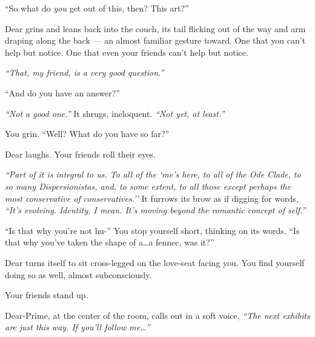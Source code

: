 \phantom{Dear, with}{\tiny its casual refusal to conform.}
\vfill

\newpage

\begin{comment}
\newpage

\null
\vfill

Dear, with its choice of form.

\null
\vfill

\newpage

\null
\vfill

Dear with its mastery of this new art.

\null
\vfill

\newpage

Dear with its casual refusal to conform.
\end{comment}

``So what do \emph{you} get out of this, then? This art?''

Dear grins and leans back into the couch, its tail flicking out of the way and arm draping along the back --- an almost familiar gesture toward. One that you can't help but notice. One that even your friends can't help but notice.

\emph{``That, my friend, is a very good question.''}

``And do you have an answer?''

\emph{``Not a good one.''} It shrugs, ineloquent. \emph{``Not yet, at least.''}

You grin. ``Well? What do you have so far?''

Dear laughs. Your friends roll their eyes.

\emph{``Part of it is integral to us. To all of the `me's here, to all of the Ode Clade, to so many Dispersionistas, and, to some extent, to all those except perhaps the most conservative of conservatives.''} It furrows its brow as if digging for words, \emph{``It's evolving. Identity, I mean. It's moving beyond the romantic concept of self.''}

``Is that why you're not hu-'' You stop yourself short, thinking on its words. ``Is that why you've taken the shape of a\ldots{}a fennec, was it?''

Dear turns itself to sit cross-legged on the love-seat facing you. You find yourself doing so as well, almost subconsciously.

Your friends stand up.

Dear-Prime, at the center of the room, calls out in a soft voice, \emph{``The next exhibits are just this way. If you'll follow me\ldots{}''}

